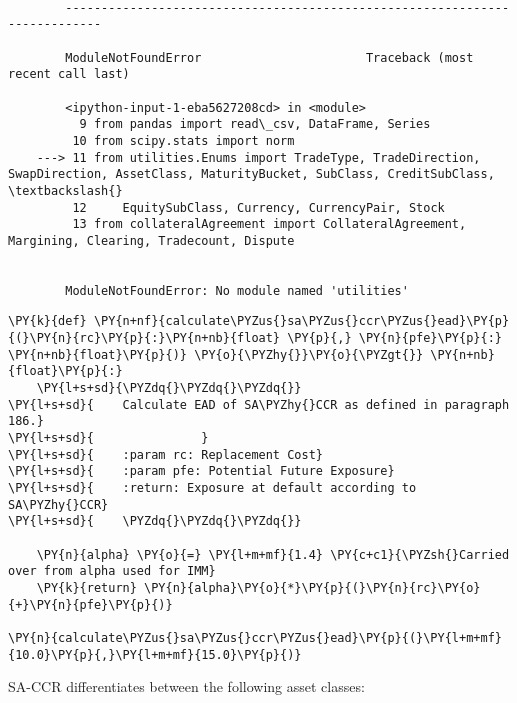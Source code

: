     \begin{Verbatim}[commandchars=\\\{\}]

        ---------------------------------------------------------------------------

        ModuleNotFoundError                       Traceback (most recent call last)

        <ipython-input-1-eba5627208cd> in <module>
          9 from pandas import read\_csv, DataFrame, Series
         10 from scipy.stats import norm
    ---> 11 from utilities.Enums import TradeType, TradeDirection, SwapDirection, AssetClass, MaturityBucket, SubClass, CreditSubClass, \textbackslash{}
         12     EquitySubClass, Currency, CurrencyPair, Stock
         13 from collateralAgreement import CollateralAgreement, Margining, Clearing, Tradecount, Dispute
    

        ModuleNotFoundError: No module named 'utilities'

    \end{Verbatim}

    \begin{tcolorbox}[breakable, size=fbox, boxrule=1pt, pad at break*=1mm,colback=cellbackground, colframe=cellborder]
\begin{Verbatim}[commandchars=\\\{\}]
\PY{k}{def} \PY{n+nf}{calculate\PYZus{}sa\PYZus{}ccr\PYZus{}ead}\PY{p}{(}\PY{n}{rc}\PY{p}{:}\PY{n+nb}{float} \PY{p}{,} \PY{n}{pfe}\PY{p}{:} \PY{n+nb}{float}\PY{p}{)} \PY{o}{\PYZhy{}}\PY{o}{\PYZgt{}} \PY{n+nb}{float}\PY{p}{:}
    \PY{l+s+sd}{\PYZdq{}\PYZdq{}\PYZdq{}}
\PY{l+s+sd}{    Calculate EAD of SA\PYZhy{}CCR as defined in paragraph 186.}
\PY{l+s+sd}{               }
\PY{l+s+sd}{    :param rc: Replacement Cost}
\PY{l+s+sd}{    :param pfe: Potential Future Exposure}
\PY{l+s+sd}{    :return: Exposure at default according to SA\PYZhy{}CCR}
\PY{l+s+sd}{    \PYZdq{}\PYZdq{}\PYZdq{}}

    \PY{n}{alpha} \PY{o}{=} \PY{l+m+mf}{1.4} \PY{c+c1}{\PYZsh{}Carried over from alpha used for IMM}
    \PY{k}{return} \PY{n}{alpha}\PY{o}{*}\PY{p}{(}\PY{n}{rc}\PY{o}{+}\PY{n}{pfe}\PY{p}{)}

\PY{n}{calculate\PYZus{}sa\PYZus{}ccr\PYZus{}ead}\PY{p}{(}\PY{l+m+mf}{10.0}\PY{p}{,}\PY{l+m+mf}{15.0}\PY{p}{)}
\end{Verbatim}
\end{tcolorbox}

    SA-CCR differentiates between the following asset classes:

